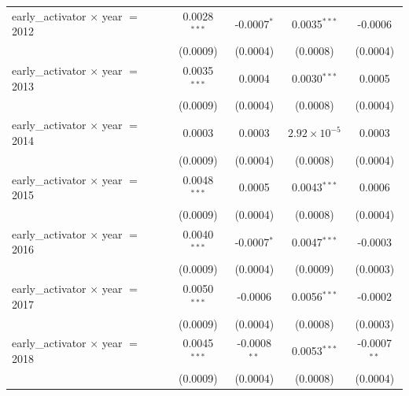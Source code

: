 \begin{tabular}{lcccc}
   early\_activator $\times$ year $=$ 2012              & 0.0028$^{***}$        & -0.0007$^{*}$             & 0.0035$^{***}$         & -0.0006\\   
                                                        & (0.0009)              & (0.0004)                  & (0.0008)               & (0.0004)\\   
   early\_activator $\times$ year $=$ 2013              & 0.0035$^{***}$        & 0.0004                    & 0.0030$^{***}$         & 0.0005\\   
                                                        & (0.0009)              & (0.0004)                  & (0.0008)               & (0.0004)\\   
   early\_activator $\times$ year $=$ 2014              & 0.0003                & 0.0003                    & $2.92\times 10^{-5}$   & 0.0003\\   
                                                        & (0.0009)              & (0.0004)                  & (0.0008)               & (0.0004)\\   
   early\_activator $\times$ year $=$ 2015              & 0.0048$^{***}$        & 0.0005                    & 0.0043$^{***}$         & 0.0006\\   
                                                        & (0.0009)              & (0.0004)                  & (0.0008)               & (0.0004)\\   
   early\_activator $\times$ year $=$ 2016              & 0.0040$^{***}$        & -0.0007$^{*}$             & 0.0047$^{***}$         & -0.0003\\   
                                                        & (0.0009)              & (0.0004)                  & (0.0009)               & (0.0003)\\   
   early\_activator $\times$ year $=$ 2017              & 0.0050$^{***}$        & -0.0006                   & 0.0056$^{***}$         & -0.0002\\   
                                                        & (0.0009)              & (0.0004)                  & (0.0008)               & (0.0003)\\   
   early\_activator $\times$ year $=$ 2018              & 0.0045$^{***}$        & -0.0008$^{**}$            & 0.0053$^{***}$         & -0.0007$^{**}$\\   
                                                        & (0.0009)              & (0.0004)                  & (0.0008)               & (0.0004)\\   

\end{tabular}

